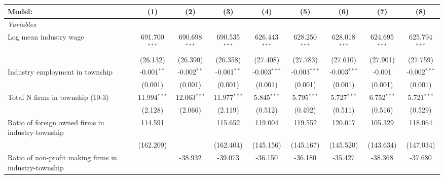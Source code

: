 \begingroup
\centering
\begin{tabular}{lcccccccc}
   \tabularnewline \midrule \midrule
   Model:                                                & (1)             & (2)             & (3)             & (4)              & (5)              & (6)              & (7)              & (8)\\  
   \midrule
   \emph{Variables}\\
   Log mean industry wage                                & 691.700$^{***}$ & 690.698$^{***}$ & 690.535$^{***}$ & 626.443$^{***}$  & 628.250$^{***}$  & 628.018$^{***}$  & 624.695$^{***}$  & 625.794$^{***}$\\   
                                                         & (26.132)        & (26.390)        & (26.358)        & (27.408)         & (27.783)         & (27.610)         & (27.901)         & (27.759)\\   
   Industry employment in township                       & -0.001$^{**}$   & -0.002$^{**}$   & -0.001$^{**}$   & -0.003$^{***}$   & -0.003$^{***}$   & -0.003$^{***}$   & -0.001           & -0.002$^{***}$\\   
                                                         & (0.001)         & (0.001)         & (0.001)         & (0.001)          & (0.001)          & (0.001)          & (0.001)          & (0.001)\\   
   Total N firms in township (10-3)                      & 11.994$^{***}$  & 12.063$^{***}$  & 11.977$^{***}$  & 5.845$^{***}$    & 5.795$^{***}$    & 5.727$^{***}$    & 6.752$^{***}$    & 5.721$^{***}$\\   
                                                         & (2.128)         & (2.066)         & (2.119)         & (0.512)          & (0.492)          & (0.511)          & (0.516)          & (0.529)\\   
   Ratio of foreign owned firms in industry-township     & 114.591         &                 & 115.652         & 119.004          & 119.552          & 120.017          & 105.329          & 118.064\\   
                                                         & (162.209)       &                 & (162.404)       & (145.156)        & (145.167)        & (145.520)        & (143.634)        & (147.034)\\   
   Ratio of non-profit making firms in industry-township &                 & -38.932         & -39.073         & -36.150          & -36.180          & -35.427          & -38.368          & -37.680\\   

\end{tabular}
